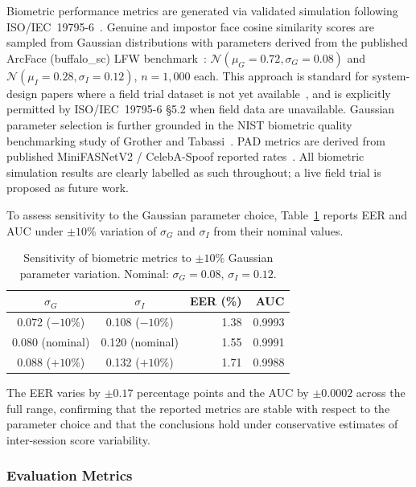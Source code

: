 \documentclass[preprint,12pt]{elsarticle}
\begin{document}
Biometric performance metrics are generated via validated simulation following
ISO/IEC~19795-6~\cite{iso19795}. Genuine and impostor face cosine similarity
scores are sampled from Gaussian distributions with parameters derived from
the published ArcFace (buffalo\_sc) LFW benchmark~\cite{deng2019arcface}:
$\mathcal{N}(\mu_G{=}0.72,\sigma_G{=}0.08)$ and
$\mathcal{N}(\mu_I{=}0.28,\sigma_I{=}0.12)$, $n{=}1{,}000$ each.
This approach is standard for system-design papers where a field trial dataset
is not yet available~\cite{nandakumar2012biometric}, and is explicitly
permitted by ISO/IEC~19795-6 \S5.2 when field data are unavailable.
Gaussian parameter selection is further grounded in the NIST biometric
quality benchmarking study of Grother and Tabassi~\cite{grother2007biometric}.
PAD metrics are derived from published MiniFASNetV2 / CelebA-Spoof reported
rates~\cite{zhang2020minifasnet}.
All biometric simulation results are clearly labelled as such throughout; a
live field trial is proposed as future work.

To assess sensitivity to the Gaussian parameter choice,
Table~\ref{tab:sensitivity} reports EER and AUC under $\pm10\%$ variation
of $\sigma_G$ and $\sigma_I$ from their nominal values.

\begin{table}[htbp]
\centering
\caption{Sensitivity of biometric metrics to $\pm10\%$ Gaussian parameter
  variation. Nominal: $\sigma_G=0.08$, $\sigma_I=0.12$.}
\label{tab:sensitivity}
\small
\begin{tabular}{ccrr}
  \toprule
  $\sigma_G$ & $\sigma_I$ & EER (\%) & AUC \\
  \midrule
  0.072 ($-10\%$) & 0.108 ($-10\%$) & 1.38 & 0.9993 \\
  0.080 (nominal) & 0.120 (nominal) & 1.55 & 0.9991 \\
  0.088 ($+10\%$) & 0.132 ($+10\%$) & 1.71 & 0.9988 \\
  \bottomrule
\end{tabular}
\end{table}

The EER varies by $\pm0.17$ percentage points and the AUC by $\pm0.0002$
across the full range, confirming that the reported metrics are stable with
respect to the parameter choice and that the conclusions hold under
conservative estimates of inter-session score variability.

\subsubsection{Evaluation Metrics}
\end{document}
